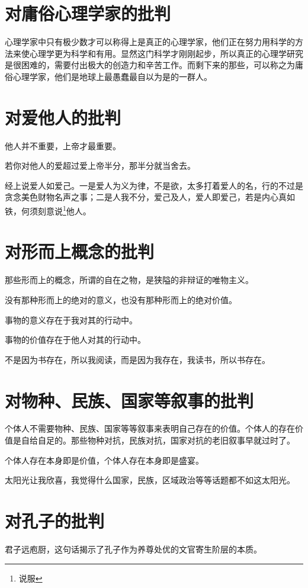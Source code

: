 \documentclass[12pt,oneside]{book}
\begin{document}
\chapter{对庸俗心理学家的批判}
心理学家中只有极少数才可以称得上是真正的心理学家，他们正在努力用科学的方法来使心理学更为科学和有用。显然这门科学才刚刚起步，所以真正的心理学研究是很困难的，需要付出极大的创造力和辛苦工作。而剩下来的那些，可以称之为庸俗心理学家，他们是地球上最愚蠢最自以为是的一群人。



\chapter{对爱他人的批判}
他人并不重要，上帝才最重要。

若你对他人的爱超过爱上帝半分，那半分就当舍去。

经上说爱人如爱己。一是爱人为义为律，不是欲，太多打着爱人的名，行的不过是贪念美色财物名声之事；二是人我不分，爱己及人，爱人即爱己，若是内心真如铁，何须刻意说\footnote{说服}他人。

\chapter{对形而上概念的批判}
那些形而上的概念，所谓的自在之物，是狭隘的非辩证的唯物主义。

没有那种形而上的绝对的意义，也没有那种形而上的绝对价值。

事物的意义存在于我对其的行动中。

事物的价值存在于他人对其的行动中。

不是因为书存在，所以我阅读，而是因为我存在，我读书，所以书存在。





\chapter{对物种、民族、国家等叙事的批判}
个体人不需要物种、民族、国家等等叙事来表明自己存在的价值。个体人的存在价值是自给自足的。那些物种对抗，民族对抗，国家对抗的老旧叙事早就过时了。

个体人存在本身即是价值，个体人存在本身即是盛宴。

太阳光让我欣喜，我觉得什么国家，民族，区域政治等等话题都不如这太阳光。

\chapter{对孔子的批判}
君子远庖厨，这句话揭示了孔子作为养尊处优的文官寄生阶层的本质。
\end{document}
